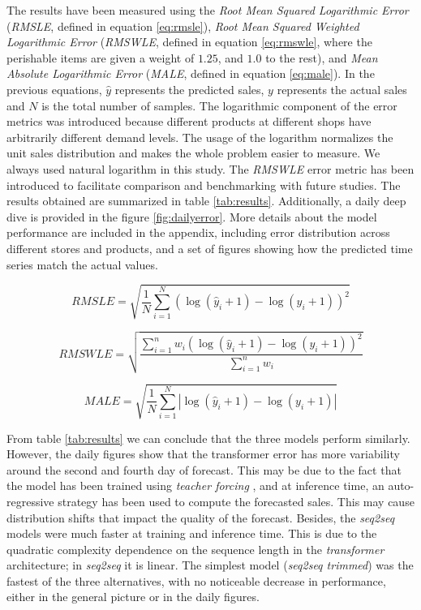 \documentclass{elsarticle}
\begin{document}
	The results have been measured using the \textit{Root Mean Squared Logarithmic Error} (\textit{RMSLE}, defined in equation \ref{eq:rmsle}), \textit{Root Mean Squared Weighted Logarithmic Error} (\textit{RMSWLE}, defined in equation \ref{eq:rmswle}, where the perishable items are given a weight of $1.25$, and $1.0$ to the rest),  and \textit{Mean Absolute Logarithmic Error} (\textit{MALE}, defined in equation \ref{eq:male}). In the previous equations, $\hat{y}$ represents the predicted sales,  $y$ represents the actual sales and $N$ is the total number of samples. The logarithmic component of the error metrics was introduced because different products at different shops have arbitrarily different demand levels. The usage of the logarithm normalizes the unit sales distribution and makes the whole problem easier to measure.  We always used natural logarithm in this study. The \textit{RMSWLE} error metric has been introduced to facilitate comparison and benchmarking with future studies. The results obtained are summarized in table \ref{tab:results}. Additionally, a daily deep dive is provided in the figure \ref{fig:dailyerror}. More details about the model performance are included in the appendix, including error distribution across different stores and products, and a set of figures showing how the predicted time series match the actual values.
	
	\begin{equation} \label{eq:rmsle}	
	RMSLE = \sqrt{ \frac{1}{N} \displaystyle\sum_{i=1}^N  \left(\log(\hat{y}_i + 1) - \log(y_i +1)  \right)^2  }
	\end{equation}
	
	\begin{equation} \label{eq:rmswle}	
	RMSWLE = \sqrt{ \frac{\displaystyle\sum_{i=1}^n w_i \left( \log(\hat{y}_i + 1) - \log(y_i +1)  \right)^2  }{\displaystyle\sum_{i=1}^n w_i}}
	\end{equation}
	
	\begin{equation} \label{eq:male}	
	MALE = \sqrt{ \frac{1}{N} \displaystyle\sum_{i=1}^N  \left|\log(\hat{y}_i + 1) - \log(y_i +1)  \right|  }
	\end{equation}
	
	From table \ref{tab:results} we can conclude that the three models perform similarly. However, the daily figures show that the transformer error has more variability around the second and fourth day of forecast. This may be due to the fact that the model has been trained using \textit{teacher forcing} \cite{williams1989, goyal2016}, and at inference time, an auto-regressive strategy has been used to compute the forecasted sales. This may cause distribution shifts that impact the quality of the forecast.  Besides, the \textit{seq2seq} models were much faster at training and inference time. This is due to the quadratic complexity dependence on the sequence length in the \textit{transformer} architecture; in \textit{seq2seq} it is linear. The simplest model (\textit{seq2seq trimmed}) was the fastest of the three alternatives, with no noticeable decrease in performance, either in the general picture or in the daily figures.
\end{document}
